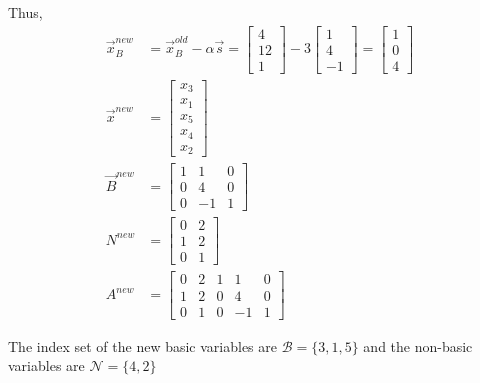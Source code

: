 \documentclass[a4paper,10pt]{article}
\begin{document}
\begin{enumerate}
\begin{enumerate}
{\begin{enumerate}
                    Thus, 
                    \begin{align}
                        \vec{x}_B^{new} &= \vec{x}_B^{old} - \alpha \vec{s} = \begin{bmatrix} 4 \\ 12 \\ 1 \end{bmatrix} - 3 \begin{bmatrix} 1 \\ 4 \\ -1 \end{bmatrix} =  \begin{bmatrix} 1 \\ 0 \\ 4 \end{bmatrix} \\
                        \vec{x}^{new} &= \begin{bmatrix} x_3 \\ x_1 \\ x_5 \\ x_4 \\ x_2 \end{bmatrix} \\
                        \vec{B}^{new} &= \begin{bmatrix}1 & 1 & 0 \\ 0 & 4 & 0 \\ 0 & -1 & 1\end{bmatrix} \\
                        N^{new} &= \begin{bmatrix} 0 & 2 \\ 1 & 2 \\ 0 & 1 \end{bmatrix} \\
                        A^{new} &= \begin{bmatrix} 0 & 2 & 1 & 1 & 0 \\ 1 & 2 & 0 & 4 & 0 \\ 0 & 1 & 0 & -1 & 1 \end{bmatrix}
                    \end{align}

                    The index set of the new basic variables are $\mathcal{B} = \{3,1,5\}$ and the non-basic variables are $\mathcal{N} = \{4,2\}$ 
                

\end{enumerate}}
\end{enumerate}
\end{enumerate}
\end{document}
